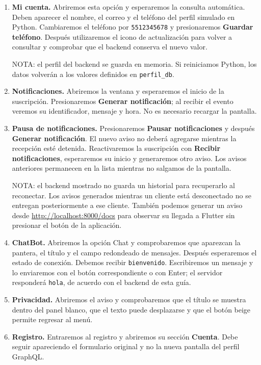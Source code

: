 \begin{enumerate}
    \item \textbf{Mi cuenta.} Abriremos esta opción y esperaremos la consulta automática. Deben aparecer el nombre, el correo y el teléfono del perfil simulado en Python. Cambiaremos el teléfono por \texttt{5512345678} y presionaremos \textbf{Guardar teléfono}. Después utilizaremos el icono de actualización para volver a consultar y comprobar que el backend conserva el nuevo valor.

    NOTA: el perfil del backend se guarda en memoria. Si reiniciamos Python, los datos volverán a los valores definidos en \texttt{perfil\_db}.

    \item \textbf{Notificaciones.} Abriremos la ventana y esperaremos el inicio de la suscripción. Presionaremos \textbf{Generar notificación}; al recibir el evento veremos su identificador, mensaje y hora. No es necesario recargar la pantalla.

    \item \textbf{Pausa de notificaciones.} Presionaremos \textbf{Pausar notificaciones} y después \textbf{Generar notificación}. El nuevo aviso no deberá agregarse mientras la recepción esté detenida. Reactivaremos la suscripción con \textbf{Recibir notificaciones}, esperaremos su inicio y generaremos otro aviso. Los avisos anteriores permanecen en la lista mientras no salgamos de la pantalla.

    NOTA: el backend mostrado no guarda un historial para recuperarlo al reconectar. Los avisos generados mientras un cliente está desconectado no se entregan posteriormente a ese cliente. También podemos generar un aviso desde \url{http://localhost:8000/docs} para observar su llegada a Flutter sin presionar el botón de la aplicación.

    \item \textbf{ChatBot.} Abriremos la opción Chat y comprobaremos que aparezcan la pantera, el título y el campo redondeado de mensajes. Después esperaremos el estado de conexión. Debemos recibir \texttt{bienvenido}. Escribiremos un mensaje y lo enviaremos con el botón correspondiente o con Enter; el servidor responderá \texttt{hola}, de acuerdo con el backend de esta guía.

    \item \textbf{Privacidad.} Abriremos el aviso y comprobaremos que el título se muestra dentro del panel blanco, que el texto puede desplazarse y que el botón beige permite regresar al menú.

    \item \textbf{Registro.} Entraremos al registro y abriremos su sección \textbf{Cuenta}. Debe seguir apareciendo el formulario original y no la nueva pantalla del perfil GraphQL.
\end{enumerate}

